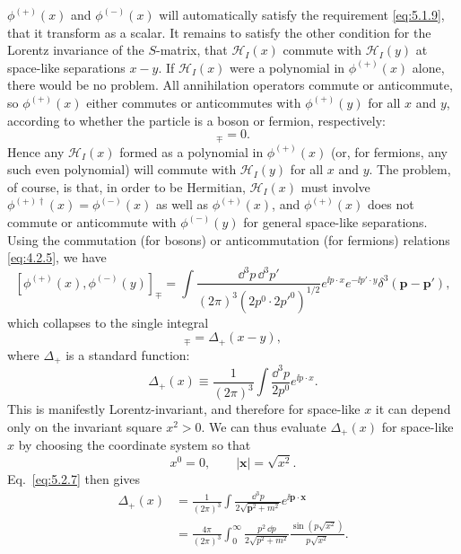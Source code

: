 $\phi^{(+)}(x)$ and $\phi^{(-)}(x)$ will automatically satisfy the requirement
\eqref{eq:5.1.9}, that it transform as a scalar. It remains to satisfy the other
condition for the Lorentz invariance of the $S$-matrix, that
$\mathcal{H}_I(x)$ commute with $\mathcal{H}_I(y)$ at space-like separations
$x-y$. If $\mathcal{H}_I(x)$ were a polynomial in $\phi^{(+)}(x)$ alone,
there would be no problem. All annihilation operators commute or anticommute,
so $\phi^{(+)}(x)$ either commutes or anticommutes with $\phi^{(+)}(y)$ for all
$x$ and $y$, according to whether the particle is a boson or fermion,
respectively:
\begin{equation}
  [\phi^{(+)}(x),\phi^{(+)}(y)]_\mp=0.
  \tag{5.2.5}\label{eq:5.2.5}
\end{equation}
Hence any $\mathcal{H}_I(x)$ formed as a polynomial in $\phi^{(+)}(x)$ (or,
for fermions, any such even polynomial) will commute with $\mathcal{H}_I(y)$
for all $x$ and $y$. The problem, of course, is that, in order to be Hermitian,
$\mathcal{H}_I(x)$ must involve $\phi^{(+)\dagger}(x)=\phi^{(-)}(x)$ as well as
$\phi^{(+)}(x)$, and $\phi^{(+)}(x)$ does not commute or anticommute with
$\phi^{(-)}(y)$ for general space-like separations. Using the commutation
(for bosons) or anticommutation (for fermions) relations \eqref{eq:4.2.5}, we have
\[
  [\phi^{(+)}(x),\phi^{(-)}(y)]_\mp
  =\int\frac{\dd^3p\,\dd^3p'}{(2\pi)^3(2p^0\cdot2p'^0)^{1/2}}
  e^{\ii p\cdot x}e^{-\ii p'\cdot y}\delta^3(\mathbf{p}-\mathbf{p}'),
\]
which collapses to the single integral
\begin{equation}
  [\phi^{(+)}(x),\phi^{(-)}(y)]_\mp=\Delta_+(x-y),
  \tag{5.2.6}\label{eq:5.2.6}
\end{equation}
where $\Delta_+$ is a standard function:
\begin{equation}
  \Delta_+(x)\equiv\frac{1}{(2\pi)^3}\int\frac{\dd^3p}{2p^0}e^{\ii p\cdot x}.
  \tag{5.2.7}\label{eq:5.2.7}
\end{equation}
This is manifestly Lorentz-invariant, and therefore for space-like $x$ it can
depend only on the invariant square $x^2>0$. We can thus evaluate $\Delta_+(x)$
for space-like $x$ by choosing the coordinate system so that
\[
  x^0=0,\qquad |\mathbf{x}|=\sqrt{x^2}.
\]
Eq.~\eqref{eq:5.2.7} then gives
\begin{align*}
  \Delta_+(x)
  & =\frac{1}{(2\pi)^3}\int\frac{\dd^3p}{2\sqrt{\mathbf{p}^2+m^2}}
  e^{\ii\mathbf{p}\cdot\mathbf{x}}
  \\
  & =\frac{4\pi}{(2\pi)^3}\int_0^\infty
  \frac{p^2\,\dd p}{2\sqrt{p^2+m^2}}
  \frac{\sin(p\sqrt{x^2})}{p\sqrt{x^2}}.
\end{align*}
